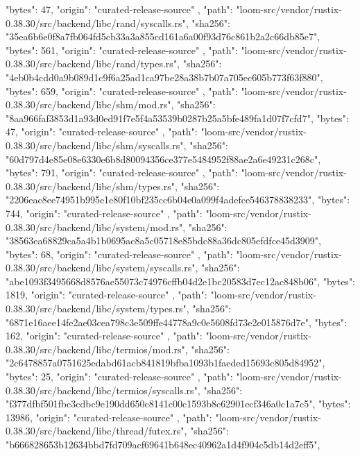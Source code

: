 {{      "bytes": 47,
      "origin": "curated-release-source"
    },
    {
      "path": "loom-src/vendor/rustix-0.38.30/src/backend/libc/rand/syscalls.rs",
      "sha256": "35ea6b6e0f8a7fb064fd5cb33a3a855cd161a6a00f93d76c861b2a2c66db85e7",
      "bytes": 561,
      "origin": "curated-release-source"
    },
    {
      "path": "loom-src/vendor/rustix-0.38.30/src/backend/libc/rand/types.rs",
      "sha256": "4eb0b4cdd0a9b089d1c9f6a25ad1ca97be28a38b7b07a705ec605b773f63f880",
      "bytes": 659,
      "origin": "curated-release-source"
    },
    {
      "path": "loom-src/vendor/rustix-0.38.30/src/backend/libc/shm/mod.rs",
      "sha256": "8aa966faf3853d1a93d0ed91f7e5f4a53539b0287b25a5bfe489fa1d07f7cfd7",
      "bytes": 47,
      "origin": "curated-release-source"
    },
    {
      "path": "loom-src/vendor/rustix-0.38.30/src/backend/libc/shm/syscalls.rs",
      "sha256": "60d797d4e85e08e6330e6b8d80094356ce377e5484952f88ae2a6e49231c268c",
      "bytes": 791,
      "origin": "curated-release-source"
    },
    {
      "path": "loom-src/vendor/rustix-0.38.30/src/backend/libc/shm/types.rs",
      "sha256": "2206eac8ee74951b995e1e80f10bf235cc6b04e0a099f4adefce546378838233",
      "bytes": 744,
      "origin": "curated-release-source"
    },
    {
      "path": "loom-src/vendor/rustix-0.38.30/src/backend/libc/system/mod.rs",
      "sha256": "38563ea68829ca5a4b1b0695ac8a5c05718e85bdc88a36dc805efdfce45d3909",
      "bytes": 68,
      "origin": "curated-release-source"
    },
    {
      "path": "loom-src/vendor/rustix-0.38.30/src/backend/libc/system/syscalls.rs",
      "sha256": "abe1093f3495668d8576ae55073c74976cffb04d2e1bc20583d7ec12ac848b06",
      "bytes": 1819,
      "origin": "curated-release-source"
    },
    {
      "path": "loom-src/vendor/rustix-0.38.30/src/backend/libc/system/types.rs",
      "sha256": "6871e16aee14fe2ae03cea798c3e509ffe44778a9c0e5608fd73e2e015876d7e",
      "bytes": 162,
      "origin": "curated-release-source"
    },
    {
      "path": "loom-src/vendor/rustix-0.38.30/src/backend/libc/termios/mod.rs",
      "sha256": "2c6478857a0751625edabd61acb841819bfba1093b1faeded15693c805d84952",
      "bytes": 25,
      "origin": "curated-release-source"
    },
    {
      "path": "loom-src/vendor/rustix-0.38.30/src/backend/libc/termios/syscalls.rs",
      "sha256": "f377dfbf501fbc3cdbc9e190dd650c8141c00c1593b8c62901ecf346a0c1a7c5",
      "bytes": 13986,
      "origin": "curated-release-source"
    },
    {
      "path": "loom-src/vendor/rustix-0.38.30/src/backend/libc/thread/futex.rs",
      "sha256": "b666828653b12634bbd7fd709acf69641b648ec40962a1d4f904c5db14d2eff5",
}}
